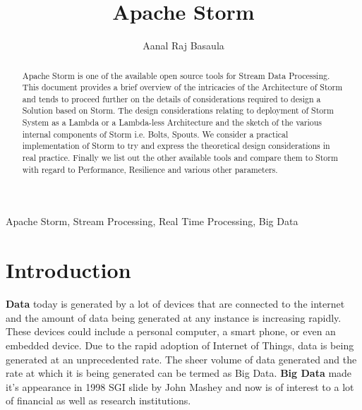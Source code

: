 \documentclass[runningheads,a4paper]{llncs}[2015/06/24]
\begin{document}
\title{Apache Storm}

\author{Aanal Raj Basaula}






\frontpageen %

\thispagestyle{empty}
\cleardoublepage

\maketitle

\begin{abstract}
Apache Storm is one of the available open source tools for Stream Data Processing. This document provides a brief overview of the intricacies of the Architecture of Storm and tends to proceed further on the details of considerations required to design a Solution based on Storm. The design considerations relating to deployment of Storm System as a Lambda or a Lambda-less Architecture and the sketch of the various internal components of Storm i.e. Bolts, Spouts. We consider a practical implementation of Storm to try and express the theoretical design considerations in real practice. Finally we list out the other available tools and compare them to Storm with regard to Performance, Resilience and various other parameters.
\end{abstract}

\begin{keywords}
Apache Storm, Stream Processing, Real Time Processing, Big Data
\end{keywords}

\section{Introduction}

\textbf{Data} today is generated by a lot of devices that are connected to the internet and the amount of data being generated at any instance is increasing rapidly. These devices could include a personal computer, a smart phone, or even an embedded device. Due to the rapid adoption of Internet of Things, data is being generated at an unprecedented rate. The sheer volume of data generated and the rate at which it is being generated can be termed as Big Data. \textbf{Big Data} made it's appearance in 1998 SGI slide by John Mashey and now is of interest to a lot of financial as well as research institutions.\cite{miningstatus}
\end{document}
